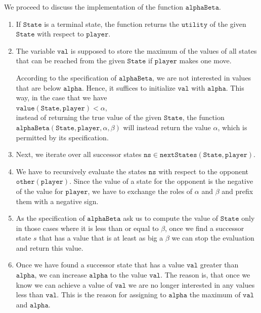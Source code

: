 We proceed to discuss the implementation of the function $\texttt{alphaBeta}$.
\begin{enumerate}
\item If $\texttt{State}$ is a terminal state, the function returns the $\texttt{utility}$ of the given
      $\texttt{State}$ with respect to $\texttt{player}$.
\item The variable $\texttt{val}$ is supposed to store the maximum of the values of all states
      that can be reached from the given $\texttt{State}$ if $\texttt{player}$ makes one move.
      
      According to the specification of $\texttt{alphaBeta}$,  we are not interested in values that are below
      $\texttt{alpha}$.  Hence, it suffices to initialize $\texttt{val}$ with $\texttt{alpha}$.   This way, in the case that we have
      \\[0.2cm]
      \hspace*{1.3cm}
      $\texttt{value}(\texttt{State},\texttt{player}) < \alpha$,
      \\[0.2cm]
      instead of returning the true value of the given $\texttt{State}$, the function
      $\texttt{alphaBeta}(\texttt{State},\texttt{player},\alpha,\beta)$ will instead return the value $\alpha$, which is permitted by its specification.
\item Next, we iterate over all successor states $\texttt{ns} \in \texttt{nextStates}(\texttt{State}, \texttt{player})$.
\item We have to recursively evaluate the states $\texttt{ns}$ with respect to the opponent  $\texttt{other}(\texttt{player})$.
      Since the value of a state for the opponent is the negative of the value for
      $\texttt{player}$, we have to exchange the roles of $\alpha$ and $\beta$ and prefix them with a negative
      sign.
\item As the specification of $\texttt{alphaBeta}$ ask us to compute the value of $\texttt{State}$ only in
      those cases where it is less than or equal to $\beta$, once we find a successor state $s$ that has a
      value that is at least as big a $\beta$ we can stop the evaluation and return this value.

\item Once we have found a successor state that has a value $\texttt{val}$ greater than $\texttt{alpha}$,
      we can increase $\texttt{alpha}$ to the value $\texttt{val}$.  The reason is, that once we know we can
      achieve a value of $\texttt{val}$ we are no longer interested in any values less than $\texttt{val}$.
      This is the reason for assigning to $\texttt{alpha}$ the maximum of $\texttt{val}$ and $\texttt{alpha}$.
\end{enumerate}

